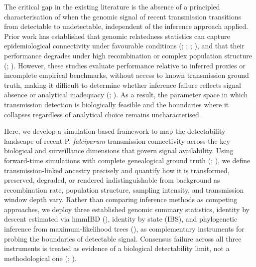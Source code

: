 \documentclass[
  11pt,
]{article}
\begin{document}
The critical gap in the existing literature is the absence of a
principled characterisation of when the genomic signal of recent
transmission transitions from detectable to undetectable, independent of
the inference approach applied. Prior work has established that genomic
relatedness statistics can capture epidemiological connectivity under
favourable conditions (;
;
;
), and that their
performance degrades under high recombination or complex population
structure (;
). However, these
studies evaluate performance relative to inferred proxies or incomplete
empirical benchmarks, without access to known transmission ground truth,
making it difficult to determine whether inference failure reflects
signal absence or analytical inadequacy
(;
). As a result, the
parameter space in which transmission detection is biologically feasible
and the boundaries where it collapses regardless of analytical choice
remains uncharacterised.

Here, we develop a simulation-based framework to map the detectability
landscape of recent P. \emph{falciparum} transmission connectivity
across the key biological and surveillance dimensions that govern signal
availability. Using forward-time simulations with complete genealogical
ground truth (;
), we define
transmission-linked ancestry precisely and quantify how it is
transformed, preserved, degraded, or rendered indistinguishable from
background as recombination rate, population structure, sampling
intensity, and transmission window depth vary. Rather than comparing
inference methods as competing approaches, we deploy three established
genomic summary statistics, identity by descent estimated via hmmIBD
(), identity by state
(IBS), and phylogenetic inference from maximum-likelihood trees
(), as complementary
instruments for probing the boundaries of detectable signal. Consensus
failure across all three instruments is treated as evidence of a
biological detectability limit, not a methodological one
(;
).
\end{document}
